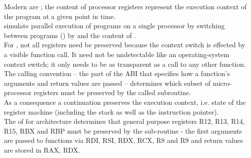 \label{mechanism}

Modern  are ; the content of
processor registers represent the execution context of the program at a given
point in time.\\
 simulate parallel execution of programs on a single
processor by switching between programs () by
 and  the content of .\\

For \cc, not all registers need be preserved because the context switch is
effected by a visible function call. It need not be undetectable like an
operating-system context switch; it only needs to be as transparent as a call
to any other function. The calling convention -- the
part of the ABI that specifies how a function's arguments and return values are
passed -- determines which subset of micro-processor registers must be
preserved by the called subroutine.\\

As a consequence a continuation preserves the execution context, i.e. state of
the register machine (including the stack as well as the instruction pointer).\\

The \cite{SYSVABI} of  for 
architecture determines that general purpose registers R12, R13, R14, R15, RBX
and RBP must be preserved by the sub-routine - the first arguments are passed
to functions via RDI, RSI, RDX, RCX, R8 and R9 and return values are stored in
RAX, RDX.\\


